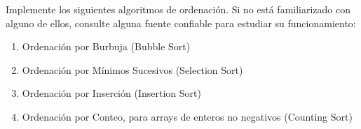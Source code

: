Implemente los siguientes algoritmos de ordenación. Si no está familiarizado con alguno de ellos, consulte alguna fuente confiable para estudiar su funcionamiento:
\begin{enumerate}
    \item Ordenación por Burbuja (Bubble Sort)
    \item Ordenación por Mínimos Sucesivos (Selection Sort)
    \item Ordenación por Inserción (Insertion Sort)
    \item Ordenación por Conteo, para arrays de enteros no negativos (Counting Sort)
\end{enumerate}